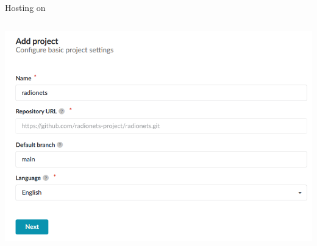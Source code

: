 \begin{frame}[fragile]{Hosting on \rtd}
\begin{columns}[onlytextwidth]
\begin{column}{0.48\textwidth}
{        \includegraphics[width=\textwidth]{graphics/rtd3.png}
      }
    \end{column}
  \end{columns}
\end{frame}

